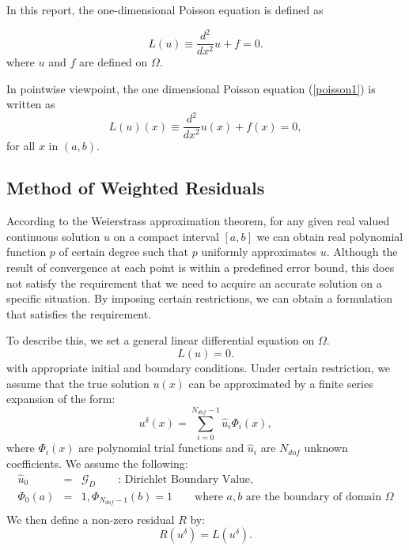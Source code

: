 In this report, the one-dimensional Poisson equation is defined as

\begin{equation}
\label{poisson1} L(u) \equiv  \frac{d^2}{dx^2} u + f = 0.
\end{equation}
where $u$ and $f$ are defined on $\Omega$.

In pointwise viewpoint, the one dimensional Poisson equation
(\ref{poisson1}) is written as
\begin{equation}
\label{poisson2} L(u)(x) \equiv \frac{d^2}{dx^2} u(x) + f(x) = 0,
\end{equation}
for all $x$ in $(a, b)$.

\subsection{Method of Weighted Residuals}
According to the Weierstrass approximation theorem, for any given
real valued continuous solution $u$ on a compact interval $[a, b]$
we can obtain real polynomial function $p$ of certain degree such
that $p$ uniformly approximates $u$. Although the result of
convergence at each point is within a predefined error bound, this
does not satisfy the requirement that we need to acquire an
accurate solution on a specific situation. By imposing certain
restrictions, we can obtain a formulation that satisfies the
requirement.

To describe this, we set a general linear differential equation on $\Omega$.
\begin{equation}
\label{pde1} L(u) = 0.
\end{equation}
with appropriate initial and boundary conditions. Under certain
restriction,  we assume that the true solution $u(x)$ can be
approximated by a finite series expansion of the form:
\begin{equation}
\label{sol1} u^{\delta}(x) = \sum_{i=0}^{N_{dof}-1} \hat u_i
\Phi_i(x),
\end{equation}
where $\Phi_i(x)$ are polynomial trial functions and $\hat u_i$
are $N_{dof}$ unknown coefficients. We assume the following:
\begin{eqnarray}
    \hat u_0  &=& \mathcal{G}_{D} \qquad \mbox{: Dirichlet Boundary Value}, \\
    \Phi_0(a) &=& 1,  \Phi_{N_{dof}-1}(b) = 1 \qquad \mbox{where $a, b$ are the boundary of domain $\Omega$}\\
\end{eqnarray}
We then define a non-zero residual $R$ by:
\begin{equation}
R(u^{\delta}) = L(u^{\delta}).
\end{equation}

